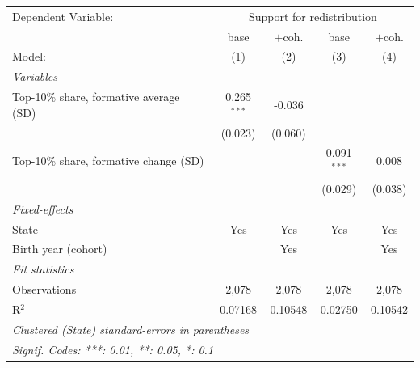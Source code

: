    \begin{tabular}{lcccc}
      \tabularnewline \midrule \midrule
      Dependent Variable: & \multicolumn{4}{c}{Support for redistribution}\\
                                              & base          & $+$coh. & base          & $+$coh. \\   
      Model:                                  & (1)           & (2)     & (3)           & (4)\\  
      \midrule
      \emph{Variables}\\
      Top-10\% share, formative average (SD)  & 0.265$^{***}$ & -0.036  &               &   \\   
                                              & (0.023)       & (0.060) &               &   \\   
      Top-10\% share, formative change (SD)   &               &         & 0.091$^{***}$ & 0.008\\   
                                              &               &         & (0.029)       & (0.038)\\   
      \midrule
      \emph{Fixed-effects}\\
      State                                   & Yes           & Yes     & Yes           & Yes\\  
      Birth year (cohort)                     &               & Yes     &               & Yes\\  
      \midrule
      \emph{Fit statistics}\\
      Observations                            & 2,078         & 2,078   & 2,078         & 2,078\\  
      R$^2$                                   & 0.07168       & 0.10548 & 0.02750       & 0.10542\\  
      \midrule \midrule
      \multicolumn{5}{l}{\emph{Clustered (State) standard-errors in parentheses}}\\
      \multicolumn{5}{l}{\emph{Signif. Codes: ***: 0.01, **: 0.05, *: 0.1}}\\
   \end{tabular}
\vspace{3pt}\par{}
